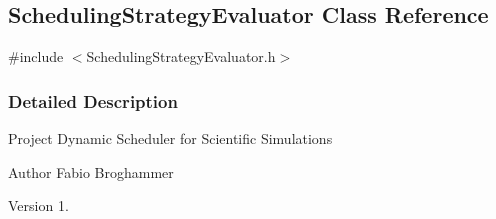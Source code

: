 \hypertarget{a00077}{}\subsection{Scheduling\+Strategy\+Evaluator Class Reference}
\label{a00077}


{\ttfamily \#include $<$Scheduling\+Strategy\+Evaluator.\+h$>$}



\subsubsection{Detailed Description}
Project Dynamic Scheduler for Scientific Simulations \begin{DoxyAuthor}{Author}
Fabio Broghammer 
\end{DoxyAuthor}
\begin{DoxyVersion}{Version}
1. 
\end{DoxyVersion}
